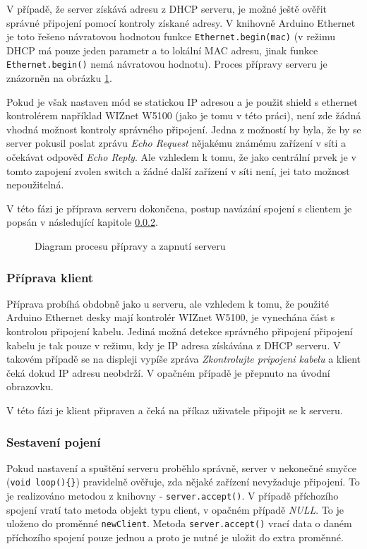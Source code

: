 V případě, že server získává adresu z DHCP serveru, je možné ještě ověřit správné připojení pomocí kontroly získané adresy. V knihovně Arduino Ethernet \cite{EthLib} je toto řešeno návratovou hodnotou funkce \texttt{Ethernet.begin(mac)} (v režimu DHCP má pouze jeden parametr a to lokální MAC adresu, jinak funkce \texttt{Ethernet.begin()} nemá návratovou hodnotu). Proces přípravy serveru je znázorněn na obrázku \ref{fig:flow:serverStartUp}.

Pokud je však nastaven mód se statickou IP adresou a je použit shield s ethernet kontrolérem například WIZnet W5100 (jako je tomu v této práci), není zde žádná vhodná možnost kontroly správného připojení. Jedna z možností by byla, že by se server pokusil poslat zprávu \textit{Echo Request} nějakému známému zařízení v síti a očekávat odpověď \textit{Echo Reply}. Ale vzhledem k tomu, že jako centrální prvek je v tomto zapojení zvolen switch a žádné další zařízení v síti není, jei tato možnost nepoužitelná.

V této fázi je příprava serveru dokončena, postup navázání spojení s clientem je popsán v následující kapitole \ref{sec:connection_communication}.

\begin{figure}
  \centering
  
  \caption{\label{fig:flow:serverStartUp} Diagram procesu přípravy a zapnutí serveru}
\end{figure}




\subsubsection{Příprava klient}
Příprava probíhá obdobně jako u serveru, ale vzhledem k tomu, že použité Arduino Ethernet desky mají kontrolér WIZnet W5100, je vynechána část s kontrolou připojení kabelu. Jediná možná detekce správného připojení připojení kabelu je tak pouze v režimu, kdy je IP adresa získávána z DHCP serveru. V takovém případě se na displeji vypíše zpráva \textit{Zkontrolujte pripojeni kabelu} a klient čeká dokud IP adresu neobdrží. V opačném případě je přepnuto na úvodní obrazovku.

V této fázi je klient připraven a čeká na příkaz uživatele připojit se k serveru.

\subsubsection{Sestavení pojení}
\label{sec:connection_communication}
Pokud nastavení a spuštění serveru proběhlo správně, server v nekonečné smyčce (\texttt{void loop()\{\}}) pravidelně ověřuje, zda nějaké zařízení nevyžaduje připojení. To je realizováno metodou z knihovny \cite{EthLib} - \texttt{server.accept()}. V případě příchozího spojení vratí tato metoda objekt typu client, v opačném případě \textit{NULL}. To je uloženo do proměnné \texttt{newClient}. Metoda \texttt{server.accept()} vrací data o daném příchozího spojení pouze jednou a proto je nutné je uložit do extra proměnné.

